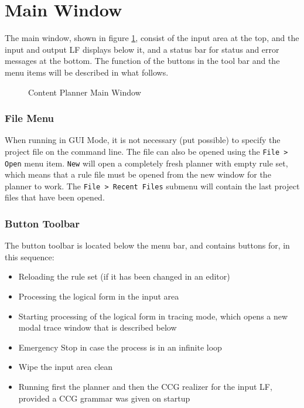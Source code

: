 \documentclass[11pt,a4paper]{report}
\begin{document}
\section{Main Window}

The main window, shown in figure \ref{fig:mainwindow}, consist of the input
area at the top, and the input and output LF displays below it, and a status
bar for status and error messages at the bottom. The function of the buttons
in the tool bar and the menu items will be described in what follows.

\begin{figure}[htbp]
  \centering
  \caption{Content Planner Main Window}
  \label{fig:mainwindow}
\end{figure}

\subsubsection{File Menu}
When running in GUI Mode, it is not necessary (put possible) to specify the
project file on the command line. The file can also be opened using the
\texttt{File > Open} menu item. \texttt{New} will open a completely fresh
planner with empty rule set, which means that a rule file must be opened from
the new window for the planner to work. The \texttt{File > Recent Files}
submenu will contain the last project files that have been opened.

\subsubsection{Button Toolbar}
The button toolbar is located below the menu bar, and contains buttons for, in
this sequence:
\begin{itemize}\addtolength{\itemsep}{-.33\itemsep}
\item Reloading the rule set (if it has been changed in an editor)
\item Processing the logical form in the input area
\item Starting processing of the logical form in tracing mode, which opens a
  new modal trace window that is described below
\item Emergency Stop in case the process is in an infinite loop
\item Wipe the input area clean
\item Running first the planner and then the CCG realizer for the input LF,
  provided a CCG grammar was given on startup
\end{itemize}
\end{document}
